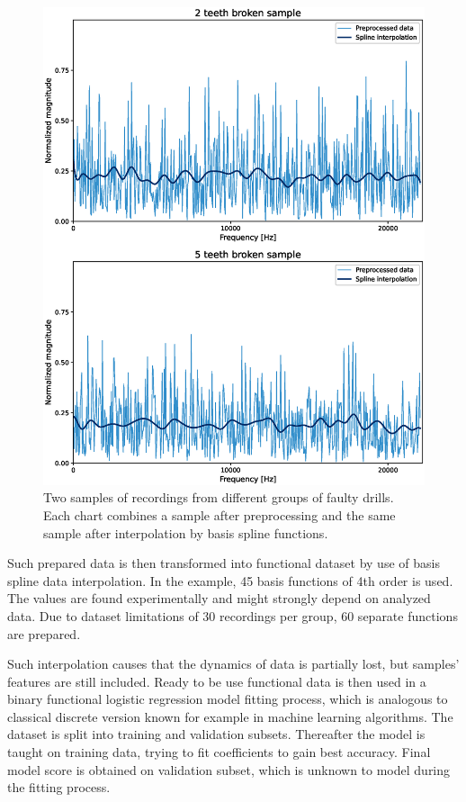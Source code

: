 \documentclass[energies,article,submit,pdftex,moreauthors]{Definitions/mdpi}
\begin{document}
\begin{figure}[H]
\includegraphics[width=\textwidth]{images/combined_data_with_splines}
\caption{Two samples of recordings from different groups of faulty drills. Each chart combines a sample after preprocessing and the same sample after interpolation by basis spline functions.}
\end{figure}
\unskip
\vspace{5mm}

Such prepared data is then transformed into functional dataset by use of basis spline data interpolation. In the example, 45 basis functions of 4th order is used. The values are found experimentally and might strongly depend on analyzed data. Due to dataset limitations of 30 recordings per group, 60 separate functions are prepared.


Such interpolation causes that the dynamics of data is partially lost, but samples' features are still included. Ready to be use functional data is then used in a binary functional logistic regression model fitting process, which is analogous to classical discrete version known for example in machine learning algorithms. The dataset is split into training and validation subsets. Thereafter the model is taught on training data, trying to fit coefficients to gain best accuracy. Final model score is obtained on validation subset, which is unknown to model during the fitting process.
\end{document}
